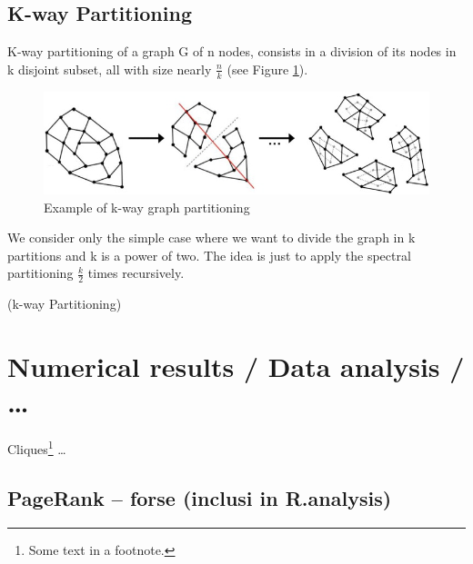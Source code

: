 \documentclass[]{usiinfbachelorproject}
\makeatletter
\def\BState{\State\hskip-\ALG@thistlm}
\makeatother
\begin{document}
\subsection{K-way Partitioning}
K-way partitioning of a graph G of n nodes, consists in a division of its nodes in k disjoint subset, all with size nearly $\frac{n}{k}$ (see Figure \ref{fig:kpartitioning}).

\begin{figure}[ht]
	\centering
	\includegraphics[height=3cm]{img/k_way_partitioning.jpg}
	\caption{Example of k-way graph partitioning}
	\label{fig:kpartitioning}
\end{figure}

We consider only the simple case where we want to divide the graph in k partitions and k is a power of two. The idea is just to apply the spectral partitioning $\frac{k}{2}$ times recursively.

\begin{algorithm}
\caption{ (k-way Partitioning)}\label{kpartitioning}
\end{algorithm}


\section{Numerical results / Data analysis / \ldots}
Cliques\footnote{Some text in a footnote.} \ldots

\subsection{PageRank -- forse (inclusi in R.analysis)}
\end{document}

